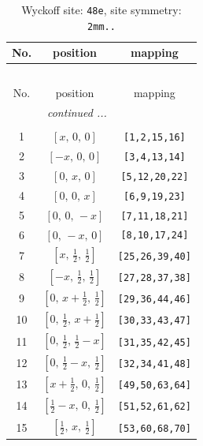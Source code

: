 \documentclass[fleqn,8pt]{jsarticle}
\begin{document}
\begin{longtable}{ccc}
\caption{Wyckoff site: {\tt 48e}, site symmetry: {\tt 2mm..}}
 \\
 \hline \hline
No. & position & mapping \\ \hline \endfirsthead

\multicolumn{2}{l}{\tablename\ \thetable{}} \\
 \hline \hline
No. & position & mapping \\ \hline \endhead

 \hline \hline
\multicolumn{2}{r}{\footnotesize\it continued ...} \\ \endfoot

 \hline \hline
\multicolumn{2}{r}{} \\ \endlastfoot

1 & $\left[ x,\, 0,\, 0 \right]$ & {\tt [1,2,15,16]} \\ \hline
2 & $\left[ - x,\, 0,\, 0 \right]$ & {\tt [3,4,13,14]} \\ \hline
3 & $\left[ 0,\, x,\, 0 \right]$ & {\tt [5,12,20,22]} \\ \hline
4 & $\left[ 0,\, 0,\, x \right]$ & {\tt [6,9,19,23]} \\ \hline
5 & $\left[ 0,\, 0,\, - x \right]$ & {\tt [7,11,18,21]} \\ \hline
6 & $\left[ 0,\, - x,\, 0 \right]$ & {\tt [8,10,17,24]} \\ \hline
7 & $\left[ x,\, \frac{1}{2},\, \frac{1}{2} \right]$ & {\tt [25,26,39,40]} \\ \hline
8 & $\left[ - x,\, \frac{1}{2},\, \frac{1}{2} \right]$ & {\tt [27,28,37,38]} \\ \hline
9 & $\left[ 0,\, x + \frac{1}{2},\, \frac{1}{2} \right]$ & {\tt [29,36,44,46]} \\ \hline
10 & $\left[ 0,\, \frac{1}{2},\, x + \frac{1}{2} \right]$ & {\tt [30,33,43,47]} \\ \hline
11 & $\left[ 0,\, \frac{1}{2},\, \frac{1}{2} - x \right]$ & {\tt [31,35,42,45]} \\ \hline
12 & $\left[ 0,\, \frac{1}{2} - x,\, \frac{1}{2} \right]$ & {\tt [32,34,41,48]} \\ \hline
13 & $\left[ x + \frac{1}{2},\, 0,\, \frac{1}{2} \right]$ & {\tt [49,50,63,64]} \\ \hline
14 & $\left[ \frac{1}{2} - x,\, 0,\, \frac{1}{2} \right]$ & {\tt [51,52,61,62]} \\ \hline
15 & $\left[ \frac{1}{2},\, x,\, \frac{1}{2} \right]$ & {\tt [53,60,68,70]} \\ \hline

\end{longtable}
\end{document}
